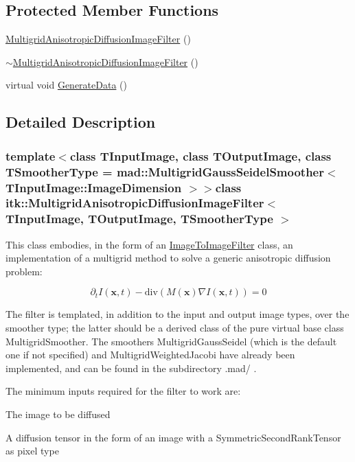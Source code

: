\subsection*{Protected Member Functions}
\begin{DoxyCompactItemize}
\item 
\hyperlink{classitk_1_1_multigrid_anisotropic_diffusion_image_filter_a18f400ab67bf4ea3b351dcf0e0fd5875}{Multigrid\-Anisotropic\-Diffusion\-Image\-Filter} ()
\item 
\hyperlink{classitk_1_1_multigrid_anisotropic_diffusion_image_filter_aa77a44fd7e8871eaa154d2c1b12d2781}{$\sim$\-Multigrid\-Anisotropic\-Diffusion\-Image\-Filter} ()
\item 
virtual void \hyperlink{classitk_1_1_multigrid_anisotropic_diffusion_image_filter_a7229e9367c9f99c4838bd75b71bdce9b}{Generate\-Data} ()
\end{DoxyCompactItemize}


\subsection{Detailed Description}
\subsubsection*{template$<$class T\-Input\-Image, class T\-Output\-Image, class T\-Smoother\-Type = mad\-::\-Multigrid\-Gauss\-Seidel\-Smoother$<$ T\-Input\-Image\-::\-Image\-Dimension $>$$>$class itk\-::\-Multigrid\-Anisotropic\-Diffusion\-Image\-Filter$<$ T\-Input\-Image, T\-Output\-Image, T\-Smoother\-Type $>$}

This class embodies, in the form of an \hyperlink{class_image_to_image_filter}{Image\-To\-Image\-Filter} class, an implementation of a multigrid method to solve a generic anisotropic diffusion problem\-: 

\[ \partial_t I(\mathbf{x}, t) - \mathrm{div} \left( M(\mathbf{x}) \nabla I(\mathbf{x}, t) \right) = 0 \]

The filter is templated, in addition to the input and output image types, over the smoother type; the latter should be a derived class of the pure virtual base class Multigrid\-Smoother. The smoothers Multigrid\-Gauss\-Seidel (which is the default one if not specified) and Multigrid\-Weighted\-Jacobi have already been implemented, and can be found in the subdirectory .mad/ .

The minimum inputs required for the filter to work are\-:


\begin{DoxyEnumerate}
\item The image to be diffused
\item A diffusion tensor in the form of an image with a Symmetric\-Second\-Rank\-Tensor as pixel type
\end{DoxyEnumerate}

